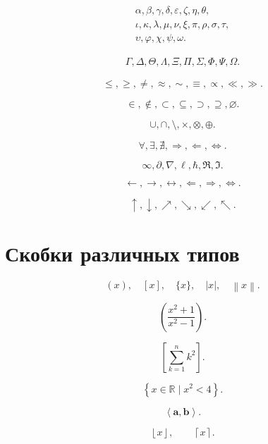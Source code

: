 \documentclass[12pt,a4paper]{article}
\theoremstyle{definition}
\theoremstyle{remark}
\newcommand{\R}{\mathbb{R}}
\newcommand{\vect}[1]{\bm{#1}}
\newcommand{\abs}[1]{\left|#1\right|}
\newcommand{\norm}[1]{\left\lVert#1\right\rVert}
\begin{document}
\[
\begin{gathered}
    \alpha,\beta,\gamma,\delta,\varepsilon,\zeta,\eta,\theta,\\
    \iota,\kappa,\lambda,\mu,\nu,\xi,\pi,\rho,\sigma,\tau,\\
    \upsilon,\varphi,\chi,\psi,\omega.
\end{gathered}
\]

\[
\begin{gathered}
    \Gamma,\Delta,\Theta,\Lambda,\Xi,\Pi,\Sigma,\Phi,\Psi,\Omega.
\end{gathered}
\]

\[
    \leq,\geq,\neq,\approx,\sim,\equiv,\propto,\ll,\gg.
\]

\[
    \in,\notin,\subset,\subseteq,\supset,\supseteq,\varnothing.
\]

\[
    \cup,\cap,\setminus,\times,\otimes,\oplus.
\]

\[
    \forall,\exists,\nexists,\Rightarrow,\Leftarrow,\Leftrightarrow.
\]

\[
    \infty,\partial,\nabla,\ell,\hbar,\Re,\Im.
\]

\[
    \leftarrow,\rightarrow,\leftrightarrow,
    \Leftarrow,\Rightarrow,\Leftrightarrow.
\]

\[
    \uparrow,\downarrow,\nearrow,\searrow,\swarrow,\nwarrow.
\]


\section{Скобки различных типов}

\[
    (x),
    \quad
    [x],
    \quad
    \{x\},
    \quad
    \abs{x},
    \quad
    \norm{x}.
\]

\[
    \left(
        \frac{x^2+1}{x^2-1}
    \right).
\]

\[
    \left[
        \sum_{k=1}^{n}k^2
    \right].
\]

\[
    \left\{
        x\in\R
        \mid
        x^2<4
    \right\}.
\]

\[
    \left\langle
        \vect{a},\vect{b}
    \right\rangle.
\]

\[
    \left\lfloor x\right\rfloor,
    \qquad
    \left\lceil x\right\rceil.
\]

\end{document}
